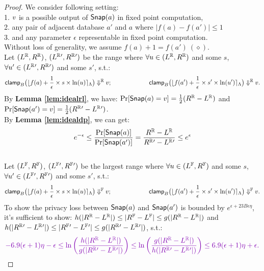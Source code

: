 \documentclass[a4paper,11pt]{article}
\begin{document}
\begin{proof}
%
%
We consider following setting:
\\
1. $v$ is a possible output of $\mathsf{Snap}(a)$ in fixed point computation,
%
\\
2. any pair of adjacent database $a'$ and $a$ where $|f(a) - f(a')| \leq 1$
%
\\
3. and any parameter $\epsilon$ representable in fixed point computation.
%
\\
Without loss of generality, we assume $f(a) + 1 = f(a') ~ (\diamond)$.
%
\\
%
%
Let $(L^{\mathbb{R}}, R^{\mathbb{R}})$, $(L^{\mathbb{R}}{'}, R^{\mathbb{R}}{'})$ be the range where 
$\forall u \in (L^{\mathbb{R}}, R^{\mathbb{R}})$ and some $s$, 
$\forall u' \in (L^{\mathbb{R}}{'}, R^{\mathbb{R}}{'})$ and some $s'$, s.t.:
%
$$\mathsf{clamp}_B \big(
	\lfloor f(a) + \frac{1}{\epsilon} \times s \times \ln (u) \rceil_{\Lambda}
	\big)
	 \Downarrow^{\mathbb{R}} v; 
~~~~~~~~~~~~~~~~~~
\mathsf{clamp}_B \big(
	\lfloor f(a') + \frac{1}{\epsilon} \times s' \times \ln (u') \rceil_{\Lambda}
	\big)
	 \Downarrow^{\mathbb{R}} v.$$
%
By \textbf{Lemma \ref{lem:idealrl}}, we have:
$\Pr[\mathsf{Snap}(a) = v] = \frac{1}{2} (R^{\mathbb{R}} - L^{\mathbb{R}})$ 
and $\Pr[\mathsf{Snap}(a') = v] = \frac{1}{2} (R^{\mathbb{R}}{'} - L^{\mathbb{R}}{'})$.
%
\\
%
By \textbf{Lemma \ref{lem:idealdp}}, we can get:
\[
	e^{-\epsilon} \leq \frac{\Pr[\mathsf{Snap}(a)]}{\Pr[\mathsf{Snap}(a')]}
	= \frac{R^{\mathbb{R}} - L^{\mathbb{R}}}{R^{\mathbb{R}}{'} - L^{\mathbb{R}}{'}} \leq e^{\epsilon}
\]
%
\\
%
Let $(L^{\mathbb{F}}, R^{\mathbb{F}})$, $(L^{\mathbb{F}}{'}, R^{\mathbb{F}}{'})$ be the largest range where 
$\forall u \in (L^{\mathbb{F}}, R^{\mathbb{F}})$ and some $s$, 
$\forall u' \in (L^{\mathbb{F}}{'}, R^{\mathbb{F}}{'})$ and some $s'$, s.t.:
%
$$
\mathsf{clamp}_B \big(
	\lfloor f(a) + \frac{1}{\epsilon} \times s \times \ln (u) \rceil_{\Lambda}
	\big)
	\Downarrow^{\mathbb{F}} v; 
~~~~~~~~~~~~~~~~~~
\mathsf{clamp}_B \big(
	\lfloor f(a') + \frac{1}{\epsilon} \times s' \times \ln (u') \rceil_{\Lambda}
	\big)
	\Downarrow^{\mathbb{F}} v.$$
%
To show the privacy loss between $\mathsf{Snap}(a)$ and $\mathsf{Snap}(a')$ is bounded by $e^{\epsilon + 23 B \epsilon \eta}$, it’s sufficient to show:
%
%
$h(|{R^{\mathbb{R}}} - {L^{\mathbb{R}}}|) \leq |R^{\mathbb{F}} - L^{\mathbb{F}}| \leq g(|{R^{\mathbb{R}}} - {L^{\mathbb{R}}}|)$ and 
$h(|{R^{\mathbb{R}}{'}} - {L^{\mathbb{R}}{'}}|) \leq |R^{\mathbb{F}}{'} - L^{\mathbb{F}}{'}|
\leq g(|{R^{\mathbb{R}}{'}} - {L^{\mathbb{R}}{'}}|) $,
%
s.t.:
%
\[
\extend{
	-6.9( \epsilon + 1) \eta - \epsilon
	\leq \ln\left(
	 \frac{h(|{\rvalR} - {\rvalL}|)}{g(|{\rvalR{'}} - {\rvalL{'}}|)} 
	 \right) 
	\leq
	\ln\left( 
	\frac{g(|{\rvalR} - {\rvalL}|)}{h(|{\rvalR{'}} - {\rvalL{'}}|)} 
	\right)
	\leq 6.9( \epsilon + 1) \eta + \epsilon.
	}
\]

\end{proof}
\end{document}
